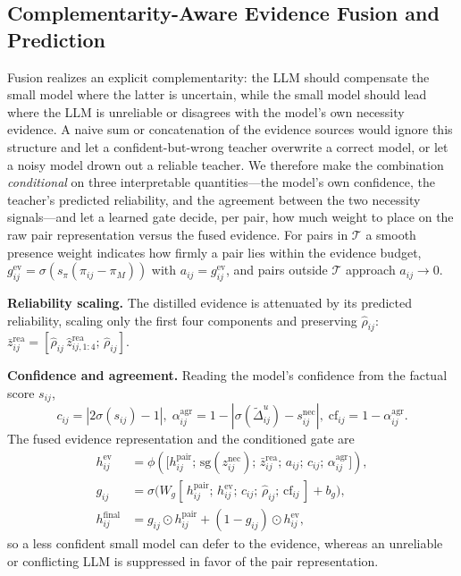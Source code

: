 \documentclass[journal]{IEEEtran}
\newcommand{\sg}{\mathrm{sg}}
\begin{document}
\subsection{Complementarity-Aware Evidence Fusion and Prediction}
\label{sec:fusion}
Fusion realizes an explicit complementarity: the LLM should compensate the small model where
the latter is uncertain, while the small model should lead where the LLM is unreliable or
disagrees with the model's own necessity evidence. A naive sum or concatenation of the
evidence sources would ignore this structure and let a confident-but-wrong teacher overwrite a
correct model, or let a noisy model drown out a reliable teacher. We therefore make the
combination \emph{conditional} on three interpretable quantities---the model's own confidence,
the teacher's predicted reliability, and the agreement between the two necessity signals---and
let a learned gate decide, per pair, how much weight to place on the raw pair representation
versus the fused evidence. For pairs in $\mathcal{T}$ a smooth
presence weight indicates how firmly a pair lies within the evidence budget,
$g^{\mathrm{ev}}_{ij}=\sigma(s_\pi(\pi_{ij}-\pi_M))$ with $a_{ij}=g^{\mathrm{ev}}_{ij}$, and
pairs outside $\mathcal{T}$ approach $a_{ij}\!\to\!0$.

\noindent\textbf{Reliability scaling.} The distilled evidence is attenuated by its predicted
reliability, scaling only the first four components and preserving $\hat\rho_{ij}$:
$\bar z_{ij}^{\mathrm{rea}}=[\hat\rho_{ij}\,\hat z_{ij,1:4}^{\mathrm{rea}};\,\hat\rho_{ij}]$.

\noindent\textbf{Confidence and agreement.} Reading the model's confidence from the factual
score $s_{ij}$,
\begin{equation}
c_{ij}=|2\sigma(s_{ij})-1|,\;
\alpha_{ij}^{\mathrm{agr}}=1-|\sigma(\tilde\Delta_{ij}^{u})-s_{ij}^{\mathrm{nec}}|,\;
\mathrm{cf}_{ij}=1-\alpha_{ij}^{\mathrm{agr}}.
\end{equation}
The fused evidence representation and the conditioned gate are
\begin{align}
h_{ij}^{\mathrm{ev}}&=\phi\!\left(\big[h_{ij}^{\mathrm{pair}};\,\sg(z_{ij}^{\mathrm{nec}});\,\bar z_{ij}^{\mathrm{rea}};\,a_{ij};\,c_{ij};\,\alpha_{ij}^{\mathrm{agr}}\big]\right),\\
g_{ij}&=\sigma\!\big(W_g[\,h_{ij}^{\mathrm{pair}};\,h_{ij}^{\mathrm{ev}};\,c_{ij};\,\hat\rho_{ij};\,\mathrm{cf}_{ij}\,]+b_g\big),\\
h_{ij}^{\mathrm{final}}&=g_{ij}\odot h_{ij}^{\mathrm{pair}}+(1-g_{ij})\odot h_{ij}^{\mathrm{ev}},
\end{align}
so a less confident small model can defer to the evidence, whereas an unreliable or
conflicting LLM is suppressed in favor of the pair representation.
\end{document}
